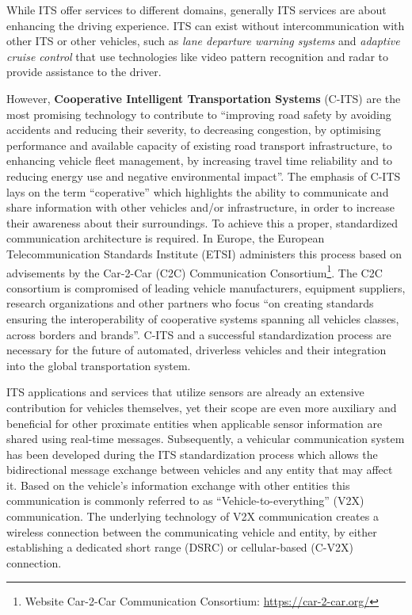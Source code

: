 While ITS offer services to different domains, generally ITS services are about enhancing the driving experience. ITS can exist without intercommunication with other ITS or other vehicles, such as \textit{lane departure warning systems} and \textit{adaptive cruise control} that use technologies like video pattern recognition and radar to provide assistance to the driver. \cite{} %

However, \textbf{Cooperative Intelligent Transportation Systems} (C-ITS) are the most promising technology to contribute to ``improving road safety by avoiding accidents and reducing their severity, to decreasing congestion, by optimising performance and available capacity of existing road transport infrastructure, to enhancing vehicle fleet management, by increasing travel time reliability and to reducing energy use and negative environmental impact''.
The emphasis of C-ITS lays on the term ``coperative'' which highlights the ability to communicate and share information with other vehicles and/or infrastructure, in order to increase their awareness about their surroundings.
To achieve this a proper, standardized communication architecture is required. In Europe, the European Telecommunication Standards Institute (ETSI) administers this process based on advisements by the Car-2-Car (C2C) Communication Consortium\footnote{Website Car-2-Car Communication Consortium: \url{https://car-2-car.org/}}.
The C2C consortium is compromised of leading vehicle manufacturers, equipment suppliers, research organizations and other partners who focus ``on creating standards ensuring the interoperability of cooperative systems spanning all vehicles classes, across borders and brands''\cite{}. %
C-ITS and a successful standardization process are necessary for the future of automated, driverless vehicles and their integration into the global transportation system.

ITS applications and services that utilize sensors are already an extensive contribution for vehicles themselves, yet their scope are even more auxiliary and beneficial for other proximate entities when applicable sensor information are shared using real-time messages.
% 
% 
% 
Subsequently, a vehicular communication system has been developed during the ITS standardization process which allows the bidirectional message exchange between vehicles and any entity that may affect it.
Based on the vehicle's information exchange with other entities this communication is commonly referred to as ``Vehicle-to-everything'' (V2X) communication.
The underlying technology of V2X communication creates a wireless connection between the communicating vehicle and entity, by either establishing a dedicated short range (DSRC) or cellular-based (C-V2X) connection.


